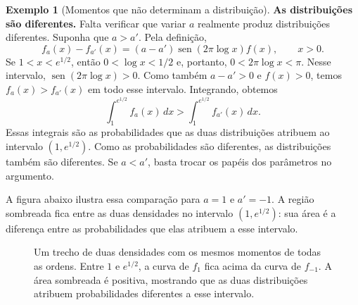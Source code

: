 \documentclass[12pt,portuguese]{article}
\theoremstyle{definition}
\newtheorem{example}[example]{Exemplo}
\theoremstyle{plainexercise}
\theoremstyle{starredexercise}
\theoremstyle{definition}
\renewcommand{\sin}{\operatorname{sen}}
\begin{document}
\begin{example}[Momentos que não determinam a distribuição]
\smallskip
\noindent\textbf{As distribuições são diferentes.}
Falta verificar que variar $a$ realmente produz distribuições diferentes.
Suponha que $a>a'$. Pela definição,
\[
f_a(x)-f_{a'}(x)=(a-a')\sin(2\pi\log x)f(x),\qquad x>0.
\]
Se $1<x<e^{1/2}$, então $0<\log x<1/2$ e, portanto,
$0<2\pi\log x<\pi$. Nesse intervalo, $\sin(2\pi\log x)>0$.
Como também $a-a'>0$ e $f(x)>0$, temos $f_a(x)>f_{a'}(x)$ em todo
esse intervalo. Integrando, obtemos
\[
\int_1^{e^{1/2}}f_a(x)\,dx
>\int_1^{e^{1/2}}f_{a'}(x)\,dx.
\]
Essas integrais são as probabilidades que as duas distribuições atribuem
ao intervalo $(1,e^{1/2})$. Como as probabilidades são diferentes, as
distribuições também são diferentes. Se $a<a'$, basta trocar os papéis
dos parâmetros no argumento.

A figura abaixo ilustra essa comparação para $a=1$ e $a'=-1$.
A região sombreada fica entre as duas densidades no intervalo
$(1,e^{1/2})$: sua área é a diferença entre as probabilidades que elas
atribuem a esse intervalo.

\begin{figure}[H]
\centering
{}
\caption{Um trecho de duas densidades com os mesmos momentos de todas as
ordens. Entre $1$ e $e^{1/2}$, a curva de $f_1$ fica acima da curva de
$f_{-1}$. A área sombreada é positiva, mostrando que as duas distribuições
atribuem probabilidades diferentes a esse intervalo.}
\label{fig:lognormal-mesmos-momentos}
\end{figure}


\end{example}
\end{document}
